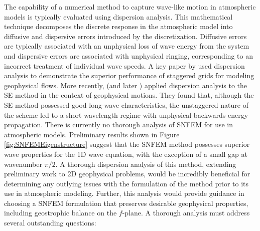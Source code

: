 \documentclass[11pt]{article}
\begin{document}

The capability of a numerical method to capture wave-like motion in atmospheric models is typically evaluated using dispersion analysis.  This mathematical technique decomposes the discrete response in the atmospheric model into diffusive and dispersive errors introduced by the discretization.  Diffusive errors are typically associated with an unphysical loss of wave energy from the system and dispersive errors are associated with unphysical ringing, corresponding to an incorrect treatment of individual wave speeds.  A key paper by \cite{DAR1994MWR} used dispersion analysis to demonstrate the superior performance of staggered grids for modeling geophysical flows.  More recently, \cite{MAHAW2009SIAMJNA} (and later \cite{TMASJT2012QJRMS}) applied dispersion analysis to the SE method in the context of geophysical motions.  They found that, although the SE method possessed good long-wave characteristics, the unstaggered nature of the scheme led to a short-wavelength regime with unphysical backwards energy propagation.  There is currently no thorough analysis of SNFEM for use in atmospheric models.  Preliminary results shown in Figure \ref{fig:SNFEMEigenstructure} suggest that the SNFEM method possesses superior wave properties for the 1D wave equation, with the exception of a small gap at wavenumber $\pi / 2$.  A thorough dispersion analysis of this method, extending preliminary work to 2D geophysical problems, would be incredibly beneficial for determining any outlying issues with the formulation of the method prior to its use in atmospheric modeling.  Further, this analysis would provide guidance in choosing a SNFEM formulation that preserves desirable geophysical properties, including geostrophic balance on the $f$-plane.  A thorough analysis must address several outstanding questions:
\end{document}

